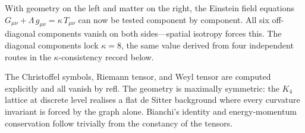\documentclass[11pt,a4paper]{book}
\def\texttt#1{#1}%
\begin{document}
With geometry on the left and matter on the right, the Einstein field
equations $G_{\mu\nu} + \Lambda\,g_{\mu\nu} = \kappa\,T_{\mu\nu}$
can now be tested component by component. All six off-diagonal
components vanish on both sides---spatial isotropy forces this. The
diagonal components lock $\kappa = 8$, the same value derived from
four independent routes in the $\kappa$-consistency record below.

The Christoffel symbols, Riemann tensor, and Weyl tensor are computed
explicitly and all vanish by \texttt{refl}. The geometry is
maximally symmetric: the $K_4$ lattice at discrete level realises a
flat de Sitter background where every curvature invariant is forced
by the graph alone. Bianchi's identity and energy-momentum
conservation follow trivially from the constancy of the tensors.
\end{document}
